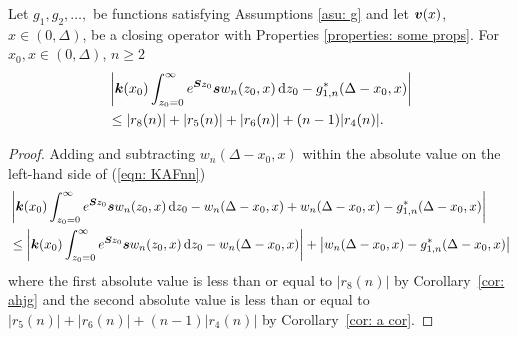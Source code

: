 \begin{cor} \label{cor: aaaaa}
	Let \(g_1,g_2,\dots,\) be functions satisfying Assumptions \ref{asu: g} and let \({\boldsymbol v}(x)\), \(x\in(0,\Delta)\), be a closing operator with Properties \ref{properties: some props}. For \(x_0,x\in(0,\Delta)\), \(n\geq 2\)
	\begin{align}
		&\left|\boldsymbol k(x_0) \int_{z_0=0}^\infty e^{\boldsymbol Sz_0}\boldsymbol sw_n(z_0,x)\, \mathrm{d} z_0- g_{1,n}^*(\Delta-x_0,x) \right| \nonumber
		\\&\leq |r_8(n)|+|r_5(n)|+|r_6(n)| + (n-1)|r_4(n)|.\label{eqn: KAFnn}
	\end{align}
\end{cor}
\begin{proof}
	Adding and subtracting \(w_n(\Delta-x_0,x)\) within the absolute value on the left-hand side of (\ref{eqn: KAFnn}) 
	\begin{align*}
		&\left| \boldsymbol k(x_0) \int_{z_0=0}^\infty e^{\boldsymbol Sz_0}\boldsymbol sw_n(z_0,x)\, \mathrm{d} z_0 \nonumber 
		 - w_n(\Delta - x_0,x) + w_n(\Delta - x_0,x) - g_{1,n}^*(\Delta - x_0,x) \right| 
		\\&\leq \left| \boldsymbol k(x_0) \int_{z_0=0}^\infty e^{\boldsymbol Sz_0}\boldsymbol sw_n(z_0,x)\, \mathrm{d} z_0 - w_n(\Delta - x_0,x)\right| + \left| w_n(\Delta - x_0,x) - g_{1,n}^*(\Delta - x_0,x) \right| 
	\end{align*}
	where the first absolute value is less than or equal to \(|r_8(n)|\) by Corollary~\ref{cor: ahjg} and the second absolute value is less than or equal to \(|r_5(n)|+|r_6(n)| + (n-1)|r_4(n)|\) by Corollary~\ref{cor: a cor}.
\end{proof}

